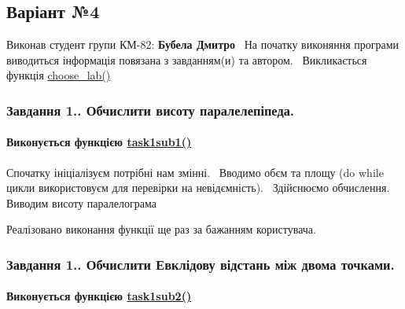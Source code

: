 \begin{center} \subsection*{Варіант №4}\end{center} 

\begin{center} \end{center}  Виконав студент групи КМ-\/82\+: {\bfseries Бубела Дмитро}~\newline
 На початку виконяння програми виводиться інформація пов\textquotesingle{}язана з завданням(и) та автором.~\newline
Викликається функція \hyperlink{main_8c_a967daaa1c8b4c7d21c4ccf7a81fbe67d}{choose\+\_\+lab()} \subsubsection*{Завдання 1.. Обчислити висоту паралелепіпеда.}

\paragraph*{Виконується функцією \hyperlink{main_8c_ad0ae7d23ef39095cda907019fd94ed96}{task1sub1()}}

Спочатку ініціалізуєм потрібні нам змінні.~\newline
Вводимо об\textquotesingle{}єм та площу ({\ttfamily do} {\ttfamily while} цикли використовуєм для перевірки на невід\textquotesingle{}ємність).~\newline
Здійснюємо обчислення. Виводим висоту паралелограма 
 Реалізовано виконання функції ще раз за бажанням користувача. \subsubsection*{Завдання 1.. Обчислити Евклідову відстань між двома точками.}

\paragraph*{Виконується функцією \hyperlink{main_8c_ab6b6fe73040966990d9129dbf55cb110}{task1sub2()}}

